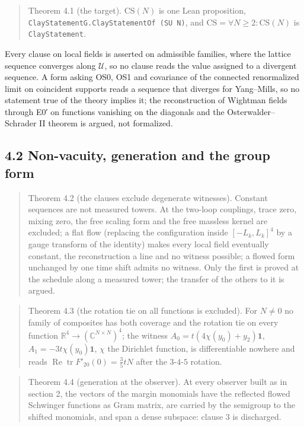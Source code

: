 \documentclass[10pt,letterpaper,twocolumn]{article}
\begin{document}
\begin{quote}
Theorem 4.1 (the target). \(\mathrm{CS}(N)\) is one Lean proposition, \texttt{ClayStatementG.\allowbreak{}ClayStatementOf\ (\allowbreak{}SU\ N)\allowbreak{}}, and \(\mathrm{CS}=\forall N\ge2:\mathrm{CS}(N)\) is \texttt{ClayStatement}.
\end{quote}

Every clause on local fields is asserted on admissible families, where the lattice sequence converges along \(\mathcal U\), so no clause reads the value assigned to a divergent sequence. A form asking OS0, OS1 and covariance of the connected renormalized limit on coincident supports reads a sequence that diverges for Yang--Mills, so no statement true of the theory implies it; the reconstruction of Wightman fields through E0′ on functions vanishing on the diagonals and the Osterwalder--Schrader II theorem is argued, not formalized.

\subsection{4.2 Non-vacuity, generation and the group form}\label{42-non-vacuity-generation-and-the-group-form}

\begin{quote}
Theorem 4.2 (the clauses exclude degenerate witnesses). Constant sequences are not measured towers. At the two-loop couplings, trace zero, mixing zero, the free scaling form and the free massless kernel are excluded; a flat flow (replacing the configuration inside \([-L_k,L_k]^4\) by a gauge transform of the identity) makes every local field eventually constant, the reconstruction a line and no witness possible; a flowed form unchanged by one time shift admits no witness. Only the first is proved at the schedule along a measured tower; the transfer of the others to it is argued.
\end{quote}

\begin{quote}
Theorem 4.3 (the rotation tie on all functions is excluded). For \(N\ne0\) no family of composites has both coverage and the rotation tie on every function \(\mathbb R^4\to(\mathbb C^{N\times N})^4\); the witness \(A_0=t(4\chi(y_0)+y_2)\mathbf1\), \(A_1=-3t\chi(y_0)\mathbf1\), \(\chi\) the Dirichlet function, is differentiable nowhere and reads \(\operatorname{Re}\operatorname{tr}F'_{20}(0)=\tfrac35tN\) after the \(3\)-\(4\)-\(5\) rotation.
\end{quote}

\begin{quote}
Theorem 4.4 (generation at the observer). At every observer built as in section 2, the vectors of the margin monomials have the reflected flowed Schwinger functions as Gram matrix, are carried by the semigroup to the shifted monomials, and span a dense subspace: clause 3 is discharged.
\end{quote}
\end{document}
